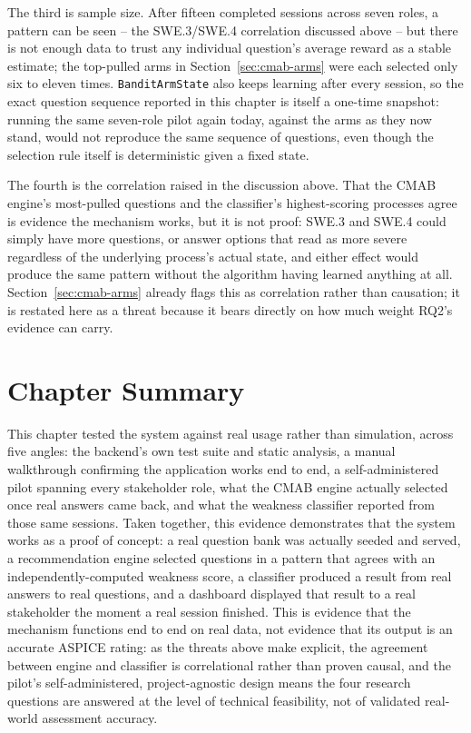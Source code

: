 \documentclass[a4paper, 12pt, oneside, openany, BCOR1cm,toc=chapterentrywithdots]{scrbook}
\begin{document}
The third is sample size. After fifteen completed sessions across seven roles, a pattern can be
seen -- the SWE.3/SWE.4 correlation discussed above -- but there is not enough data to trust any
individual question's average reward as a stable estimate; the top-pulled arms in
Section~\ref{sec:cmab-arms} were each selected only six to eleven times.
\texttt{BanditArmState} also keeps learning after every session, so the exact question sequence
reported in this chapter is itself a one-time snapshot: running the same seven-role pilot again
today, against the arms as they now stand, would not reproduce the same sequence of questions,
even though the selection rule itself is deterministic given a fixed state.

The fourth is the correlation raised in the discussion above. That the CMAB engine's most-pulled
questions and the classifier's highest-scoring processes agree is evidence the mechanism works,
but it is not proof: SWE.3 and SWE.4 could simply have more questions, or answer options that
read as more severe regardless of the underlying process's actual state, and either effect would
produce the same pattern without the algorithm having learned anything at all.
Section~\ref{sec:cmab-arms} already flags this as correlation rather than causation; it is
restated here as a threat because it bears directly on how much weight RQ2's evidence can carry.

\section{Chapter Summary}

This chapter tested the system against real usage rather than simulation, across five angles:
the backend's own test suite and static analysis, a manual walkthrough confirming the
application works end to end, a self-administered pilot spanning every stakeholder role, what
the CMAB engine actually selected once real answers came back, and what the weakness classifier
reported from those same sessions. Taken together, this evidence demonstrates that the system
works as a proof of concept: a real question bank was actually seeded and served, a
recommendation engine selected questions in a pattern that agrees with an
independently-computed weakness score, a classifier produced a result from real answers to real
questions, and a dashboard displayed that result to a real stakeholder the moment a real session
finished. This is evidence that the mechanism functions end to end on real data, not evidence
that its output is an accurate ASPICE rating: as the threats above make explicit, the agreement
between engine and classifier is correlational rather than proven causal, and the pilot's
self-administered, project-agnostic design means the four research questions are answered at
the level of technical feasibility, not of validated real-world assessment accuracy.
\end{document}
